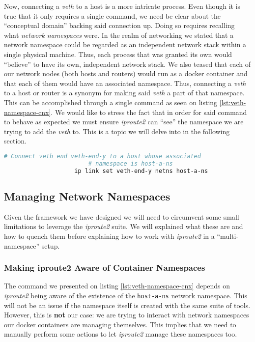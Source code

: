                 Now, connecting a \textit{veth} to a host is a more intricate process. Even though it is true that it only requires a single command, we need be clear about the ``conceptual domain'' backing said connection up. Doing so requires recalling what \textit{network namespaces} were. In the realm of networking we stated that a network namespace could be regarded as an independent network stack within a single physical machine. Thus, each process that was granted its own would ``believe'' to have its own, independent network stack. We also teased that each of our network nodes (both hosts and routers) would run as a docker container and that each of them would have an associated namespace. Thus, connecting a \textit{veth} to a host or router is a synonym for making said \textit{veth} a part of that namespace. This can be accomplished through a single command as seen on listing \ref{lst:veth-namespace-cnx}. We would like to stress the fact that in order for said command to behave as expected we must ensure \textit{iproute2} can ``see'' the namespace we are trying to add the \textit{veth} to. This is a topic we will delve into in the following section.\\

                \begin{lstlisting}[language = bash, caption = Connecting a Veth End to a Host or Router., label = lst:veth-namespace-cnx]
                    # Connect veth end veth-end-y to a host whose associated
                        # namespace is host-a-ns
                    ip link set veth-end-y netns host-a-ns
                \end{lstlisting}

        \subsection{Managing Network Namespaces}
            Given the framework we have designed we will need to circumvent some small limitations to leverage the \textit{iproute2} suite. We will explained what these are and how to quench them before explaining how to work with \textit{iproute2} in a ``multi-namespace'' setup.\\

            \subsubsection{Making iproute2 Aware of Container Namespaces}
                The command we presented on listing \ref{lst:veth-namespace-cnx} depends on \textit{iproute2} being aware of the existence of the \texttt{host-a-ns} network namespace. This will not be an issue if the namespace itself is created with the same suite of tools. However, this is \textbf{not} our case: we are trying to interact with network namespaces our docker containers are managing themselves. This implies that we need to manually perform some actions to let \textit{iproute2} manage these namespaces too.\\

